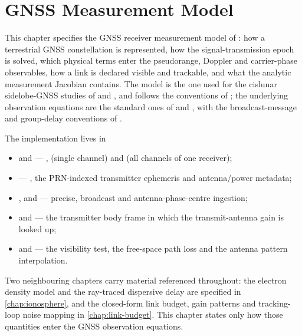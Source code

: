 \chapter{GNSS Measurement Model}
\label{chap:gnss-measurements}

This chapter specifies the GNSS receiver measurement model of \lupnt{}: how a
terrestrial GNSS constellation is represented, how the signal-transmission
epoch is solved, which physical terms enter the pseudorange, Doppler and
carrier-phase observables, how a link is declared visible and trackable, and
what the analytic measurement Jacobian contains. The model is the one used
for the cislunar sidelobe-GNSS studies of \citet{iiyama2024navi} and
\citet{iiyama2026scud}, and follows the conventions of
\citet[Ch.~6]{iiyama2026thesis}; the underlying observation equations are the
standard ones of \citet{misra2011gnss} and \citet{kaplan2017}, with the
broadcast-message and group-delay conventions of \citet{icdgps200}.

The implementation lives in

\begin{itemize}[leftmargin=1.4em,itemsep=1pt]
  \item {} and
         ---
        ,  (single channel) and
         (all channels of one receiver);
  \item {} ---
        , the PRN-indexed transmitter ephemeris and
        antenna/power metadata;
  \item {},
         and
         --- precise, broadcast and
        antenna-phase-centre ingestion;
  \item {} and
         --- the transmitter
        body frame in which the transmit-antenna gain is looked up;
  \item {} and
         --- the visibility test, the
        free-space path loss and the antenna pattern interpolation.
\end{itemize}

Two neighbouring chapters carry material referenced throughout: the electron
density model and the ray-traced dispersive delay are specified in
\cref{chap:ionosphere}, and the closed-form link budget, gain patterns and
tracking-loop noise mapping in \cref{chap:link-budget}. This chapter states
only how those quantities enter the GNSS observation equations.

